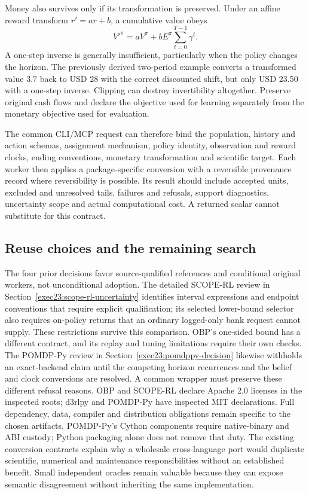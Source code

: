 Money also survives only if its transformation is preserved. Under an affine
reward transform $r'=ar+b$, a cumulative value obeys
\[
 V'^\pi=aV^\pi+bE^\pi\sum_{t=0}^{T-1}\gamma^t.
\]
A one-step inverse is generally insufficient, particularly when the policy
changes the horizon. The previously derived two-period example converts a
transformed value $3.7$ back to USD 28 with the correct discounted shift, but
only USD 23.50 with a one-step inverse. Clipping can destroy invertibility
altogether. Preserve original cash flows and declare the objective used for
learning separately from the monetary objective used for evaluation.
\citep{exec15_d3rlpy_value,exec15_d3rlpy_exact}

The common CLI/MCP request can therefore bind the population, history and action
schemas, assignment mechanism, policy identity, observation and reward clocks,
ending conventions, monetary transformation and scientific target. Each worker
then applies a package-specific conversion with a reversible provenance record
where reversibility is possible. Its result should include accepted units,
excluded and unresolved tails, failures and refusals, support diagnostics,
uncertainty scope and actual computational cost. A returned scalar cannot
substitute for this contract.

\subsection{Reuse choices and the remaining search}

The four prior decisions favor source-qualified references and conditional
original workers, not unconditional adoption. The detailed SCOPE-RL review
in Section~\ref{exec23:scope-rl-uncertainty} identifies interval expressions
and endpoint conventions that require explicit qualification; its selected
lower-bound selector also requires on-policy returns that an ordinary
logged-only bank request cannot supply. These restrictions survive this
comparison. OBP's one-sided bound has a different contract, and its replay
and tuning limitations require their own checks. The POMDP-Py review in
Section~\ref{exec23:pomdppy-decision} likewise withholds an exact-backend claim
until the competing horizon recurrences and the belief and clock conversions
are resolved. A common wrapper must preserve these different refusal reasons. OBP and SCOPE-RL declare Apache
2.0 licenses in the inspected roots; d3rlpy and POMDP-Py have inspected MIT
declarations. Full dependency, data, compiler and distribution obligations
remain specific to the chosen artifacts. POMDP-Py's Cython components require
native-binary and ABI custody; Python packaging alone does not remove that duty.
The existing conversion contracts explain why a wholesale cross-language port
would duplicate scientific, numerical and maintenance responsibilities without
an established benefit. Small independent oracles remain valuable because they
can expose semantic disagreement without inheriting the same implementation.
\citep{exec23_obp_sources,exec23_scope_rl_sources,exec15_d3rlpy_package,
exec15_d3rlpy_contract,exec23_pomdppy_sources}

